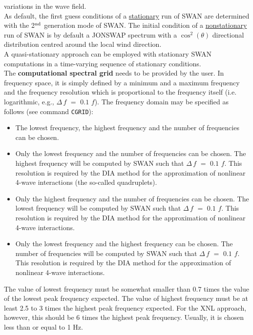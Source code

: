 \documentclass[12pt]{book}
\begin{document}
variations in the wave field.
\\[2ex]
\noindent
As default, the first guess conditions of a \underline{stationary} run of SWAN are determined with the
2$^{{\rm nd}}$ generation mode of SWAN. The initial condition of a \underline{nonstationary} run of SWAN
is by default a JONSWAP spectrum with a $\cos ^{2} (\theta )$ directional distribution centred around the
local wind direction.
\\[2ex]
\noindent
A quasi-stationary approach can be employed with stationary SWAN computations in a time-varying sequence
of stationary conditions.
\\[2ex]
\noindent
The {\bf computational spectral grid} needs to be provided by the user. In frequency space, it is simply
defined by a minimum and a maximum frequency and the frequency resolution which is proportional to
the frequency itself (i.e. logarithmic, e.g., $\Delta\, f\,\, =\,\, 0.1\,\, f$). The frequency domain may
be specified as follows (see command {\tt CGRID}):
\begin{itemize}
  \item The lowest frequency, the highest frequency and the number of frequencies can be chosen.
  \item Only the lowest frequency and the number of frequencies can be chosen. The highest frequency
        will be computed by SWAN such that $\Delta\, f\,\, =\,\, 0.1\,\, f$. This resolution is required
        by the DIA method for the approximation of nonlinear 4-wave interactions (the so-called quadruplets).
  \item Only the highest frequency and the number of frequencies can be chosen. The lowest frequency
        will be computed by SWAN such that $\Delta\, f\,\, =\,\, 0.1\,\, f$. This resolution is required by
        the DIA method for the approximation of nonlinear 4-wave interactions.
  \item Only the lowest frequency and the highest frequency can be chosen. The number of frequencies
        will be computed by SWAN such that $\Delta\, f\,\, =\,\, 0.1\,\, f$. This resolution is required
        by the DIA method for the approximation of nonlinear 4-wave interactions.
\end{itemize}
The value of lowest frequency must be somewhat smaller than 0.7 times the value of the lowest peak
frequency expected. The value of highest frequency must be at least 2.5 to 3 times the highest peak
frequency expected. For the XNL approach, however, this should be 6 times the highest peak frequency.
Usually, it is chosen less than or equal to 1 Hz.
\end{document}
